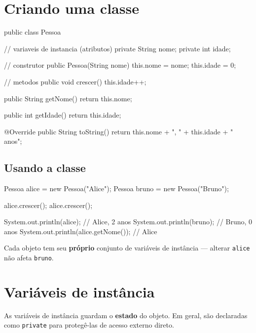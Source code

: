\documentclass[12pt, a4paper]{article}
\newcommand{\code}[1]{\texttt{\color{javaDeep}#1}}
\begin{document}
\section{Criando uma classe}

\begin{javacode}
public class Pessoa {
    // variaveis de instancia (atributos)
    private String nome;
    private int idade;

    // construtor
    public Pessoa(String nome) {
        this.nome = nome;
        this.idade = 0;
    }

    // metodos
    public void crescer() {
        this.idade++;
    }

    public String getNome() {
        return this.nome;
    }

    public int getIdade() {
        return this.idade;
    }

    @Override
    public String toString() {
        return this.nome + ", " + this.idade + " anos";
    }
}
\end{javacode}

\subsection{Usando a classe}

\begin{javacode}
Pessoa alice = new Pessoa("Alice");
Pessoa bruno = new Pessoa("Bruno");

alice.crescer();
alice.crescer();

System.out.println(alice);           // Alice, 2 anos
System.out.println(bruno);           // Bruno, 0 anos
System.out.println(alice.getNome()); // Alice
\end{javacode}

Cada objeto tem seu \textbf{próprio} conjunto de variáveis de instância --- alterar \code{alice} não afeta \code{bruno}.

\section{Variáveis de instância}

As variáveis de instância guardam o \textbf{estado} do objeto. Em geral, são declaradas como \code{private} para protegê-las de acesso externo direto.
\end{document}
